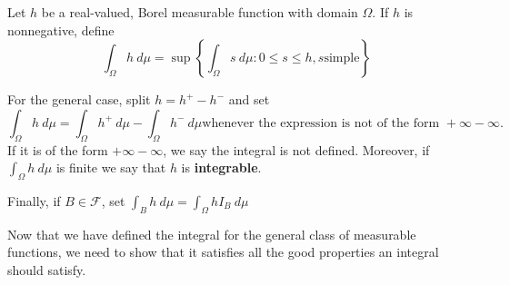 \begin{defn} Let \(h\) be a real-valued, Borel measurable function with
domain \(\Omega\). If \(h\) is nonnegative, define
	\[\int_\Omega h~d\mu=\sup\left\{\int_\Omega s~d\mu\colon 0\leq s\leq h, s \text{
simple}\right\}\]
	
	For the general case, split \(h=h^+-h^-\) and set
	\[\int_{\Omega}h~d\mu=\int_{\Omega}h^+~d\mu-\int_{\Omega}h^-~d\mu \text{
whenever the expression is not of the form }+\infty-\infty.\] If it is of the
form \(+\infty-\infty\), we say the integral is not defined. Moreover, if
\(\int_{\Omega}h~d\mu\) is finite we say that \(h\) is \textbf{integrable}.
	
	Finally, if \(B\in\mathcal{F}\), set \(\int_{B}h~d\mu=\int_{\Omega}hI_B~d\mu\)
\end{defn}
Now that we have defined the integral for the general class of measurable
functions, we need to show that it satisfies all the good properties an integral should satisfy.


